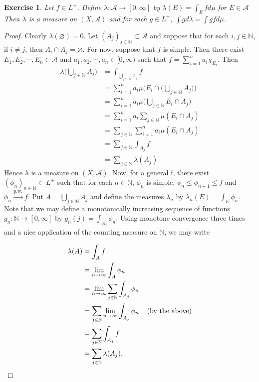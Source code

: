 \documentclass[12pt]{amsart}
\newtheorem{ex}[thm]{Exercise}
\newcommand{\lam}{\lambda}
\newcommand{\N}{\mathbb{N}}
\newcommand{\MA}{\mathcal{A}}
\newcommand{\RG}{[0,\infty]}
\newcommand{\Rg}{[0,\infty)}
\newcommand{\limn}{\lim \limits_{n \rightarrow \infty}}
\begin{document}
\begin{ex}
Let $f \in L^+$. Define $\lam: \MA \rightarrow \RG$ by $\lam(E) = \int_E f d\mu$ for $E \in \MA$
Then $\lam$ is a measure on $(X, \MA)$ and for each $g \in L^+$, $\int g d\lam = \int g f d\mu$.
\end{ex}

\begin{proof}
Clearly $\lam(\varnothing) = 0$. Let $(A_j)_{j \in \N} \subset \MA$ and suppose that for each $i, j \in \N$, if $i \neq j$, then $A_i \cap A_j = \varnothing$. For now, suppose that $f$ is simple. Then there exist $E_1, E_2, \cdots, E_n \in \MA$ and  $a_1, a_2, \cdots, a_n \in \Rg$ such that $f = \sum\limits_{i=1}^n a_i \chi_{E_i}$.  Then 
\begin{align*}
\lam\bigg(\bigcup_{j \in \N} A_j\bigg) 
&= \int_{\bigcup_{j \in \N} A_j} f\\
&= \sum_{i = 1} ^n a_i\mu\bigg(E_i \cap \bigg(\bigcup_{j \in \N} A_j\bigg)\bigg)\\
&= \sum_{i = 1} ^n a_i\mu\bigg(\bigcup_{j \in \N} E_i \cap A_j\bigg)\\
&= \sum_{i = 1} ^n a_i \sum_{j \in \N} \mu(E_i \cap A_j)\\
&= \sum_{j \in \N} \sum_{i = 1} ^n a_i \mu(E_i \cap A_j)\\
&= \sum_{j \in \N} \int_{A_j} f\\
&= \sum_{j \in \N} \lam(A_j)
\end{align*} 
Hence $\lam$ is a measure on $(X, \MA)$. Now, for a general f, there exist $(\phi_n)_{n \in \N} \subset L^+$ such that for each $n \in \N$, $\phi_n$ is simple, $\phi_n \leq \phi_{n+1} \leq f$ and $\phi_n \xrightarrow{\text{p.w.}} f$. Put $A = \bigcup_{j \in \N}A_j$ and define the measures $\lam_n$ by $\lam_n(E) = \int_E \phi_n$. Note that we may define a monotonically increasing sequence of functions $g_n: \N \rightarrow \RG$ by $g_n(j) = \int_{A_j} \phi_n$. Using monotone convergence three times and a nice application of the counting measure on $\N$, we may write

\begin{align*}
\lam(A) 
&= \int_A f\\
&= \limn \int_A \phi_n\\
&= \limn \sum_{j \in \N} \int_{A_j} \phi_n\\
&= \sum_{j \in \N} \limn \int_{A_j} \phi_n \hspace{4mm} \text{(by the above)}\\
&= \sum_{j \in \N} \int_{A_j} f\\
&= \sum_{j \in \N} \lam(A_j).
\end{align*} 


\end{proof}
\end{document}

